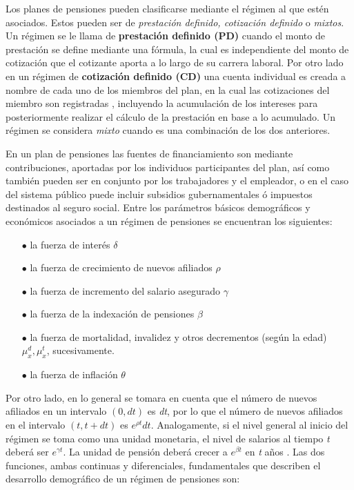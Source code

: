 \documentclass[12pt,letterpaper,titlepage]{article}
\begin{document}
Los planes de pensiones pueden clasificarse mediante el régimen al que estén asociados. Estos pueden ser de \textit{prestación definido,  cotización definido} o \textit{mixtos}. Un régimen se le llama de \textbf{prestación definido (PD)} cuando el monto de prestación se define mediante una fórmula, la cual es independiente del monto de cotización que el cotizante aporta a lo largo de su carrera laboral. Por otro lado en un régimen de \textbf{cotización definido (CD)} una cuenta individual es creada a nombre de cada uno de los miembros del plan, en la cual las cotizaciones del miembro son registradas \cite{778}, incluyendo la acumulación de los intereses para posteriormente realizar el cálculo de la prestación en base a lo acumulado. Un régimen se considera \textit{mixto} cuando es una combinación de los dos anteriores. 

En un plan de pensiones las fuentes de financiamiento son mediante contribuciones, aportadas por los individuos participantes del plan, así como también pueden ser en conjunto por los trabajadores y el empleador, o en el caso del sistema público puede incluir subsidios gubernamentales ó impuestos destinados al seguro social. Entre los parámetros básicos demográficos y económicos asociados a un régimen de pensiones se encuentran los siguientes:
 
\begin{itemize}
	\item [$\bullet$] la fuerza de interés $\delta$
 	\item [$\bullet$] la fuerza de crecimiento de nuevos afiliados $\rho$
 	\item [$\bullet$] la fuerza de incremento del salario asegurado $\gamma$
 	\item [$\bullet$] la fuerza de la indexación de pensiones $\beta$
 	\item [$\bullet$] la fuerza de mortalidad, invalidez y otros decrementos (según la edad) $\mu_{x}^{d}, \mu_{x}^{t}$, sucesivamente.
 	\item [$\bullet$] la fuerza de inflación $\theta$
 \end{itemize}
 
  
 Por otro lado, en lo general se tomara en cuenta que el número de nuevos afiliados en un intervalo $(0, dt)$ es \textit{dt}, por lo que el número de nuevos afiliados en el intervalo $(t, t+dt)$ es $e^{\rho t}dt$. Analogamente, si el nivel general al inicio del régimen se toma como una unidad monetaria, el nivel de salarios al tiempo \textit{t} deberá ser $e^{\gamma t}$. La unidad de pensión deberá crecer a $e^{\beta t}$ en \textit{t} años \cite{778}. Las dos funciones, ambas continuas y diferenciales, fundamentales que describen el desarrollo demográfico de un régimen de pensiones son:
\end{document}
